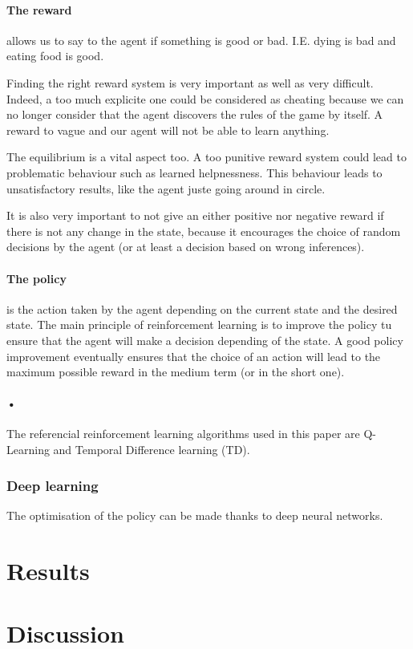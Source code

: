 \documentclass{article}
\begin{document}
\paragraph{The reward}
allows us to say to the agent if something is good or bad. I.E. dying is bad and eating food is good.\par 
Finding the right reward system is very important as well as very difficult. Indeed, a too much explicite one could be considered as cheating because we can no longer consider that the agent discovers the rules of the game by itself. A reward to vague and our agent will not be able to learn anything.\par 
The equilibrium is a vital aspect too. A too punitive reward system could lead to problematic behaviour such as learned helpnessness\cite{wiki:learned_helplessness}. This behaviour leads to unsatisfactory results, like the agent juste going around in circle.\par
It is also very important to not give an either positive nor negative reward if there is not any change in the state, because it encourages the choice of random decisions by the agent (or at least a decision based on wrong inferences).

\paragraph{The policy}
is the action taken by the agent depending on the current state and the desired state. The main principle of reinforcement learning is to improve the policy tu ensure that the agent will make a decision depending of the state. A good policy improvement eventually ensures that the choice of an action will lead to the maximum possible reward in the medium term (or in the short one).

\paragraph{•}
The referencial reinforcement learning algorithms used in this paper are Q-Learning\cite{watkins1992q} and Temporal Difference learning (TD)\cite{tsitsiklis1997analysis}.

\subsubsection{Deep learning}

The optimisation of the policy can be made thanks to deep neural networks. 

\section{Results}

\section{Discussion}



\end{document}
